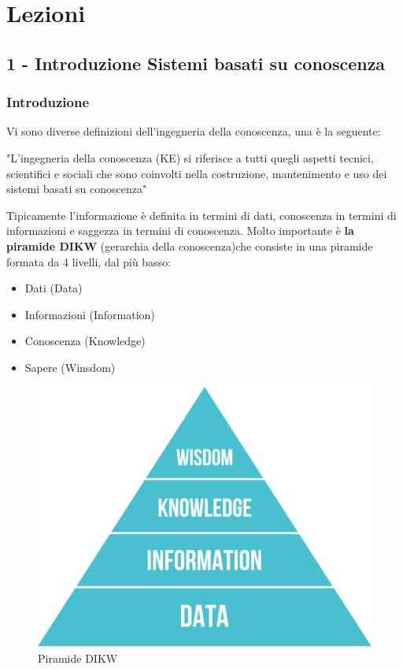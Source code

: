 \documentclass[a4paper]{extarticle}
\begin{document}
\newpage 
\section{Lezioni}

\subsection{1 - Introduzione Sistemi basati su conoscenza}

\subsubsection{Introduzione}

Vi sono diverse definizioni dell'ingegneria della conoscenza, una è la seguente:

\begin{center}
	"L'ingegneria della conoscenza (KE) si riferisce a tutti quegli aspetti tecnici, scientifici e sociali che sono coinvolti nella costruzione, mantenimento e uso dei sistemi basati su conoscenza"
\end{center}

Tipicamente l'informazione è definita in termini di dati, conoscenza in termini di informazioni e saggezza in termini di conoscenza. Molto importante è \textbf{la piramide DIKW} (gerarchia della conoscenza)che consiste in una piramide formata da 4 livelli, dal più basso:
\begin{itemize}
	\item Dati (Data)
	\item  Informazioni (Information)
	\item Conoscenza (Knowledge)
	\item Sapere (Winsdom)
\end{itemize}

\begin{figure}[h!]
\begin{center}
\includegraphics[scale=.3]{wkid.png}
\caption{Piramide DIKW}
\end{center}

\end{figure}
\end{document}
